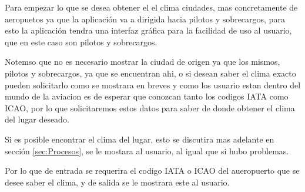 Para empezar lo que se desea obtener el el clima ciudades, mas concretamente de aeropuetos ya que
la aplicación va a dirigida hacia pilotos y sobrecargos, para esto la aplicación tendra una interfaz gráfica
para la facilidad de uso al usuario, que en este caso son pilotos y sobrecargos.

Notemso que no es necesario mostrar la ciudad de origen ya que los mismos, pilotos y sobrecargos, ya que se encuentran ahi, o si
desean saber el clima exacto pueden solicitarlo como se mostrara en breves y como los usuario estan dentro del mundo de la aviacion
es de esperar que conozcan tanto los codigos IATA como ICAO, por lo que solicitaremos estos datos para saber de donde obtener el clima
del lugar deseado.

Si es posible encontrar el clima del lugar, esto se discutira mas adelante en sección \ref{sec:Procesos}, se le mostara al usuario, al igual que si hubo problemas.

Por lo que de entrada se requerira el codigo IATA o ICAO del aueropuerto que se desee saber el clima, y de salida se le mostrara este al usuario.
